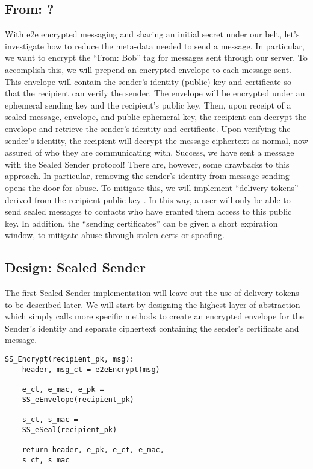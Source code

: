 \documentclass[conference]{IEEEtran}
\begin{document}
\subsection{From: ?}
With e2e encrypted messaging and sharing an initial secret under our belt, let's investigate how to reduce the meta-data needed to send a message. In particular, we want to encrypt the “From: Bob” tag for messages sent through our server. To accomplish this, we will prepend an encrypted envelope to each message sent. This envelope will contain the sender’s identity (public) key and certificate so that the recipient can verify the sender. The envelope will be encrypted under an ephemeral sending key and the recipient's public key. Then, upon receipt of a sealed message, envelope, and public ephemeral key, the recipient can decrypt the envelope and retrieve the sender’s identity and certificate. Upon verifying the sender’s identity, the recipient will decrypt the message ciphertext as normal, now assured of who they are communicating with. Success, we have sent a message with the Sealed Sender protocol! There are, however, some drawbacks to this approach. In particular, removing the sender's identity from message sending opens the door for abuse. To mitigate this, we will implement “delivery tokens” derived from the recipient public key \cite{https://signal.org/blog/sealed-sender/}. In this way, a user will only be able to send sealed messages to contacts who have granted them access to this public key. In addition, the “sending certificates” can be given a short expiration window, to mitigate abuse through stolen certs or spoofing.

\subsection{Design: Sealed Sender}

The first Sealed Sender implementation will leave out the use of delivery tokens to be described later. We will start by designing the highest layer of abstraction which simply calls more specific methods to create an encrypted envelope for the Sender's identity and separate ciphertext containing the sender's certificate and message.
\newline

\begin{Verbatim}[frame=single]
SS_Encrypt(recipient_pk, msg):
    header, msg_ct = e2eEncrypt(msg)
    
    e_ct, e_mac, e_pk = 
    SS_eEnvelope(recipient_pk)

    s_ct, s_mac = 
    SS_eSeal(recipient_pk)

    return header, e_pk, e_ct, e_mac, 
    s_ct, s_mac
        
\end{Verbatim}
\end{document}
